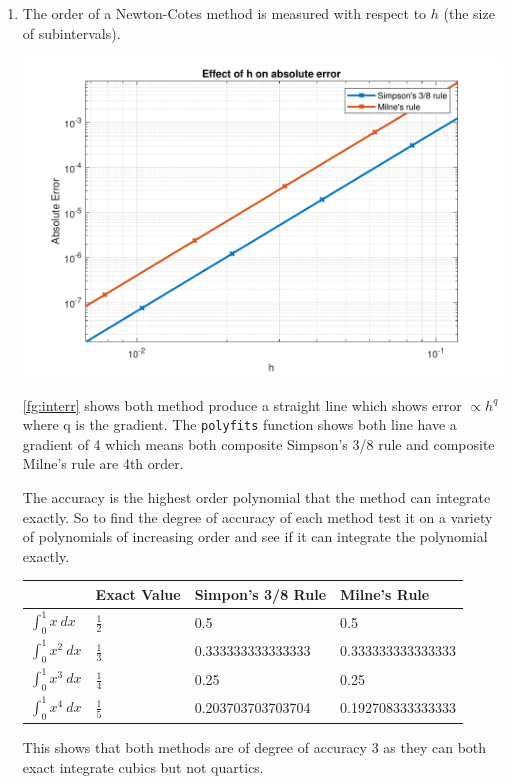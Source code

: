 \documentclass[a4paper,11pt]{article}
\begin{document}
\begin{enumerate}
\begin{enumerate}
		
		\item The order of a Newton-Cotes method is measured with respect to 
		$h$ (the size of subintervals).
		\begin{center}
			\includegraphics[scale=0.7]{images/Q2aii.pdf}
			\label{fg:interr}
		\end{center}
		\autoref{fg:interr} shows both method produce a straight line which 
		shows error $\propto h^{q}$ where q is the gradient. The 
		\verb*|polyfits| function shows both line have a gradient of 4 which 
		means both composite Simpson's 3/8 rule and composite Milne's rule 
		are 4th order.
		
		The accuracy is the highest order polynomial that the method can 
		integrate exactly. So to find the degree of accuracy of each method 
		test it on a variety of polynomials of increasing order and see if it 
		can integrate the polynomial exactly.
		
		\begin{center}
			\begin{tabular}{l|lll}
				& Exact Value    & Simpon's 3/8 Rule & Milne's Rule      \\ 
				\hline
				$\int_{0}^{1}x \ dx$     & $\frac{1}{2}$ & 0.5               
				& 0.5               \\
				$\int_{0}^{1}x^{2} \ dx$ & $\frac{1}{3}$ & 0.333333333333333 
				& 0.333333333333333 \\
				$\int_{0}^{1}x^{3} \ dx$ & $\frac{1}{4}$ & 0.25              
				& 0.25              \\
				$\int_{0}^{1}x^{4} \ dx$ & $\frac{1}{5}$ & 0.203703703703704 
				& 0.192708333333333
			\end{tabular}
		\end{center}
		This shows that both methods are of degree of accuracy 3 as they can 
		both exact integrate cubics but not quartics.
		

\end{enumerate}
\end{enumerate}
\end{document}
